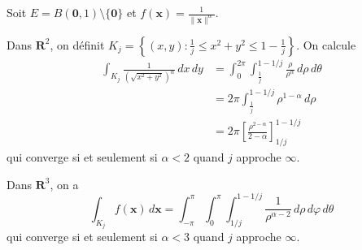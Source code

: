 \begin{example}[Important !]
Soit $E=B(\boldsymbol{0},1)\setminus \{ \boldsymbol{0}\}$ et $f(\boldsymbol{x})=\frac{1}{\lVert \boldsymbol{x} \rVert^{\alpha}}$.

Dans $\mathbf{R}^{2}$, on définit $K_{j}=\left\{  (x,y): \frac{1}{j}\le x^{2}+y^{2}\le 1-\frac{1}{j}  \right\}$. On calcule
\begin{align*}
\int _{K_{j}}  \frac{1}{(\sqrt{ x^{2}+y^{2} })^{\alpha}} \, dx \,dy & =\int_{0}^{2\pi} \int_{\frac{1}{j}}^{1-1/j} \frac{\rho}{\rho^{\alpha}} \, d\rho  \, d\theta \\
 & =2\pi \int_{\frac{1}{j}}^{1-1/j} \rho^{1-\alpha} \, d\rho \\
  & =2\pi\left[ \frac{\rho^{2-\alpha}}{2-\alpha} \right]^{1-1/j} _{1/j} 
\end{align*}
qui converge si et seulement si $\alpha<2$ quand $j$ approche $\infty$.

Dans $\mathbf{R}^{3}$, on a 
$$
	\int _{K_{j}}f(\boldsymbol{x})\,d\boldsymbol{x}=\int_{-\pi}^{\pi} \int_{0}^{\pi} \int_{1/j}^{1-1/j} \frac{1}{\rho^{\alpha -2}}  \, d\rho  \, d\varphi  \, d\theta 
$$
qui converge si et seulement si $\alpha < 3$ quand $j$ approche $\infty$.
\end{example}

